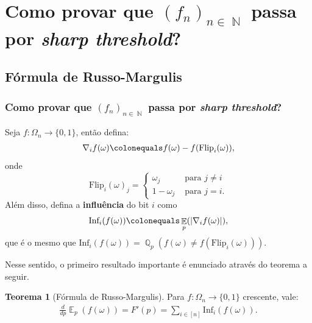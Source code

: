 \documentclass[9pt]{beamer}
\theoremstyle{definition} %
\newtheorem{mythm}{Teorema}
\DeclareMathOperator{\EX}{\mathbb{E}} %
\DeclareMathOperator{\NX}{\mathbb{N}} %
\DeclareMathOperator{\QX}{\mathbb{Q}} %
\newcommand{\diff}{{\nabla_i}f(\omega)}
\newcommand{\flip}{\text{Flip}_i(\omega)}
\newcommand{\infl}{\text{Inf}_i(f(\omega))}
\begin{document}
	\section{Como provar que $(f_n)_{n \in \NX}$ passa por \textit{\textbf{sharp threshold}}?}
	\subsection{Fórmula de Russo-Margulis}
	\begin{frame}[t]
		\frametitle{Como provar que $(f_n)_{n \in \NX}$ passa por \textit{\textbf{sharp threshold}}?}	
		Seja $f: \Omega_n \to  \{0,1\}$, então defina:
		\begin{align*}
		\diff \colonequals f(\omega) - f(\flip),
		\end{align*}
		onde
		\[ \flip_j = \begin{cases}
		\omega_j   & \text{ para } j \neq i \\
		1 - \omega_j & \text{ para } j = i.
		\end{cases}
		\]
		Além disso, defina a \textbf{influência} do bit $i$ como 
		\begin{align*}
		\infl \colonequals \EX_p(|\diff|),
		\end{align*}
		que é o mesmo que $\infl = \QX_p(f(\omega) \neq f(\flip))$.
		\pause
		
		Nesse sentido, o primeiro resultado importante é enunciado através do teorema a seguir.
		\begin{mythm}[Fórmula de Russo-Margulis] \label{thm:russo-margulis}
			Para $f: \Omega_n \to \{0,1\}$ crescente, vale:
			\begin{align*}
			\frac{d}{dp}\EX_p(f(\omega)) = F'(p) = \sum_{i \in [n]} \infl.
			\end{align*}
		\end{mythm}
	\end{frame}
\end{document}

